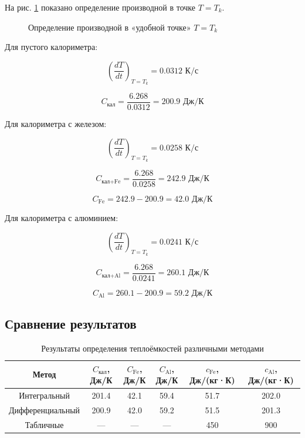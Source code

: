 \documentclass{article}
\begin{document}
На рис. \ref{fig:derivatives} показано определение производной в точке $T = T_k$.

\begin{figure}[H]
\centering
\caption{Определение производной в «удобной точке» $T = T_k$}
\label{fig:derivatives}
\end{figure}

Для пустого калориметра:

\begin{equation}
\left(\frac{dT}{dt}\right)_{T=T_k} = 0.0312 \text{ К/с}
\end{equation}

\begin{equation}
C_{\text{кал}} = \frac{6.268}{0.0312} = 200.9 \text{ Дж/К}
\end{equation}

Для калориметра с железом:

\begin{equation}
\left(\frac{dT}{dt}\right)_{T=T_k} = 0.0258 \text{ К/с}
\end{equation}

\begin{equation}
C_{\text{кал+Fe}} = \frac{6.268}{0.0258} = 242.9 \text{ Дж/К}
\end{equation}

\begin{equation}
C_{\text{Fe}} = 242.9 - 200.9 = 42.0 \text{ Дж/К}
\end{equation}

Для калориметра с алюминием:

\begin{equation}
\left(\frac{dT}{dt}\right)_{T=T_k} = 0.0241 \text{ К/с}
\end{equation}

\begin{equation}
C_{\text{кал+Al}} = \frac{6.268}{0.0241} = 260.1 \text{ Дж/К}
\end{equation}

\begin{equation}
C_{\text{Al}} = 260.1 - 200.9 = 59.2 \text{ Дж/К}
\end{equation}

\subsection*{Сравнение результатов}

\begin{table}[H]
\centering
\caption{Результаты определения теплоёмкостей различными методами}
\begin{tabular}{|c|c|c|c|c|c|}
\hline
Метод & $C_{\text{кал}}$, Дж/К & $C_{\text{Fe}}$, Дж/К & $C_{\text{Al}}$, Дж/К & $c_{\text{Fe}}$, Дж/(кг·К) & $c_{\text{Al}}$, Дж/(кг·К) \\
\hline
Интегральный & 201.4 & 42.1 & 59.4 & 51.7 & 202.0 \\
Дифференциальный & 200.9 & 42.0 & 59.2 & 51.5 & 201.3 \\
\hline
Табличные & --- & --- & --- & 450 & 900 \\
\hline
\end{tabular}
\end{table}
\end{document}
